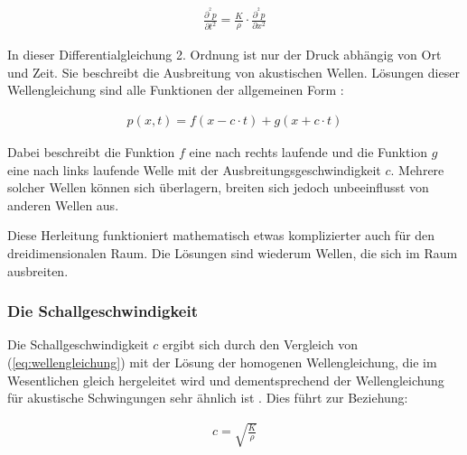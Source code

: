 \begin{equation}
\begin{gathered}
\frac{\partial ^{^{2}}p}{\partial t^{2}}=\frac{K}{\rho} \cdot \frac{\partial ^{^{2}}p}{\partial x^{2}}
\end{gathered}\label{eq:wellengleichung}
\end{equation}

In dieser Differentialgleichung 2. Ordnung ist nur der Druck abhängig von Ort und Zeit. Sie beschreibt die Ausbreitung von akustischen Wellen. Lösungen dieser Wellengleichung sind alle Funktionen der allgemeinen Form \cite{LOOSER}:

\begin{equation}
\begin{gathered}
p(x,t)=f(x-c \cdot t) + g(x + c \cdot t)
\end{gathered}\label{eq:loesung_wellengleichung}
\end{equation}

Dabei beschreibt die Funktion $f$  eine nach rechts laufende und die Funktion $g$ eine nach links laufende Welle mit der Ausbreitungsgeschwindigkeit $c$. Mehrere solcher Wellen können sich überlagern, breiten sich jedoch unbeeinflusst von anderen Wellen aus.

Diese Herleitung funktioniert mathematisch etwas komplizierter auch für den dreidimensionalen Raum. Die Lösungen sind wiederum Wellen, die sich im Raum ausbreiten.

\subsubsection{Die Schallgeschwindigkeit}\label{sec:die_schallgeschwindigkeit}
Die Schallgeschwindigkeit $c$ ergibt sich durch den Vergleich von (\ref{eq:wellengleichung}) mit der Lösung der homogenen Wellengleichung, die im Wesentlichen gleich hergeleitet wird und dementsprechend der Wellengleichung für akustische Schwingungen sehr ähnlich ist \cite{HERING}. Dies führt zur Beziehung:

\begin{equation}
\begin{gathered}
c = \sqrt{\frac{K}{\rho}}
\end{gathered}\label{eq:schallgeschwindigkeit_1}
\end{equation}

